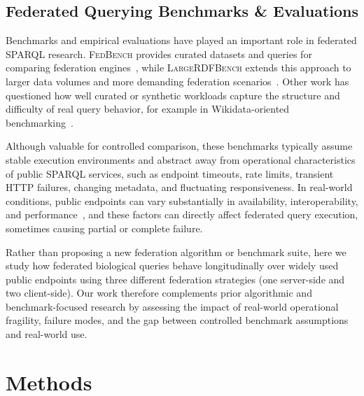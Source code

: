 \documentclass[runningheads]{llncs}
\begin{document}
\subsection{Federated Querying Benchmarks \& Evaluations}\label{sec3.2}
Benchmarks and empirical evaluations have played an important role in federated SPARQL research.
\textsc{FedBench} provides curated datasets and queries for comparing federation engines~\cite{Schmidt2011FedBench,Saleem2014FedBench}, while \textsc{LargeRDFBench} extends this approach to larger data volumes and more demanding federation scenarios~\cite{Saleem2018LargeRDFBench}. 
Other work has questioned how well curated or synthetic workloads capture the structure and difficulty of real query behavior, for example in Wikidata-oriented benchmarking~\cite{Hernandez2015Wikidata}.

Although valuable for controlled comparison, these benchmarks typically assume stable execution environments and abstract away from operational characteristics of public SPARQL services, such as endpoint timeouts, rate limits, transient HTTP failures, changing metadata, and fluctuating responsiveness.
In real-world conditions, public endpoints can vary substantially in availability, interoperability, and performance~\cite{Vandenbussche2017SPARQLES}, and these factors can directly affect federated query execution, sometimes causing partial or complete failure.

Rather than proposing a new federation algorithm or benchmark suite, here we study how federated biological queries behave longitudinally over widely used public endpoints using three different federation strategies (one server-side and two client-side).
Our work therefore complements prior algorithmic and benchmark-focused research by assessing the impact of real-world operational fragility, failure modes, and the gap between controlled benchmark assumptions and real-world use.


\section{Methods}\label{sec4}
\end{document}
